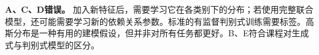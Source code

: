 \textbf{A、C、D错误。} 加入新特征后，需要学习它在各类别下的分布；若使用完整联合模型，还可能需要学习新的依赖关系参数。标准的有监督判别式训练需要标签。高斯分布是一种有用的建模假设，但并非对所有任务都更好。B、E符合课程对生成式与判别式模型的区分。
